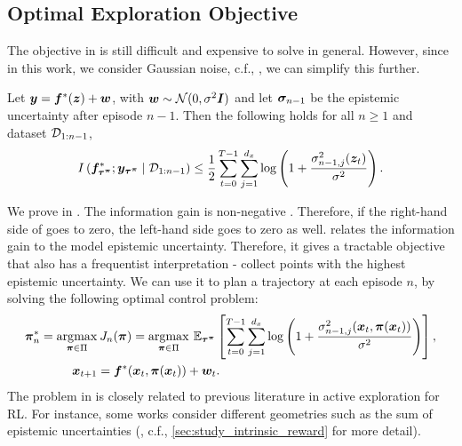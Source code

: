 \subsection{Optimal Exploration Objective}
The objective in  is still difficult and expensive to solve in general. However, since in this work, we consider Gaussian noise, c.f., , we can simplify this further.
\begin{lemma}\label{lem:uniform_exploration_upper}
  Let ${\bm{y}} = {\bm{f}}^*({\bm{z}}) + {\bm{w}}$, with ${\bm{w}} \sim {\mathcal{N}}(0, \sigma^2{\bm{I}})$ and let ${\bm{\sigma}}_{n-1}$ be the epistemic uncertainty after episode $n-1$. Then the following holds for all $n\geq 1$ and dataset ${\mathcal{D}}_{1:n-1}$, 
  \begin{align}
      \label{eq:tractable_obj}
    I\left({\bm{f}}^*_{{\bm{\tau}}^{{\bm{\pi}}}}; {\bm{y}}_{{\bm{\tau}}^{{\bm{\pi}}}} \mid {\mathcal{D}}_{1:n-1}\right) \leq \frac{1}{2} \sum_{t=0}^{T-1} \sum^{d_x}_{j=1}\log \left(1 + \frac{\sigma_{n-1, j}^2({\bm{z}}_t)}{\sigma^2}\right).
  \end{align}
  \end{lemma}
  We prove  in .  
  The information gain is non-negative \citep{elementsofIT}. Therefore, if the right-hand side of  goes to zero, the left-hand side goes to zero as well.   relates the information gain to the model epistemic uncertainty. Therefore, it gives a tractable objective that also has a frequentist interpretation - collect points with the highest epistemic uncertainty. We can use it to plan a trajectory at each episode $n$, by solving the following optimal control problem:
  \begin{align}
      {\bm{\pi}}^*_n = \operatorname*{arg\!\max}_{{\bm{\pi}} \in \Pi}& \hspace{0.2em} J_n({\bm{\pi}}) = \operatorname*{arg\!\max}_{{\bm{\pi}} \in \Pi} \hspace{0.2em} \mathbb{E}_{{\bm{\tau}}^{{\bm{\pi}}}}\left[\sum_{t=0}^{T-1} \sum^{d_x}_{j=1} \log \left(1 + \frac{\sigma_{n-1, j}^2({\bm{x}}_t, {\bm{\pi}}({\bm{x}}_t))}{\sigma^2}\right)\right],       \label{eq:exploration_op} \\
      {\bm{x}}_{t+1} &= {\bm{f}}^{*}({\bm{x}}_t, {\bm{\pi}}({\bm{x}}_t)) + {\bm{w}}_t. \notag
  \end{align}
  The problem in  is closely related to previous literature in active exploration for RL. For instance, some works consider different geometries such as the sum of epistemic uncertainties (\cite{pathak2019self, sekar2020planning}, c.f., \cref{sec:study_intrinsic_reward} for more detail).
